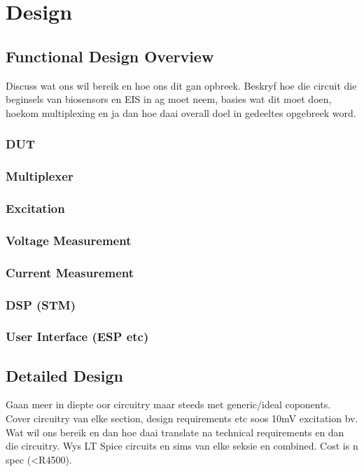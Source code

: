 \graphicspath{{design/fig/}}

\chapter{Design}

\section{Functional Design Overview}
Discuss wat ons wil bereik en hoe ons dit gan opbreek. Beskryf hoe die circuit die beginsels van biosensors en EIS in ag moet neem, basies wat dit moet doen, hoekom multiplexing en ja dan hoe daai overall doel in gedeeltes opgebreek word.

\subsection{DUT}

\subsection{Multiplexer}

\subsection{Excitation}

\subsection{Voltage Measurement}

\subsection{Current Measurement}

\subsection{DSP (STM)}

\subsection{User Interface (ESP etc)}

\section{Detailed Design}
Gaan meer in diepte oor circuitry maar steeds met generic/ideal coponents. Cover circuitry van elke section, design requirements etc soos 10mV excitation bv. Wat wil ons bereik en dan hoe daai translate na technical requirements en dan die circuitry. Wys LT Spice circuits en sims van elke seksie en combined. Cost is n spec (<R4500).

